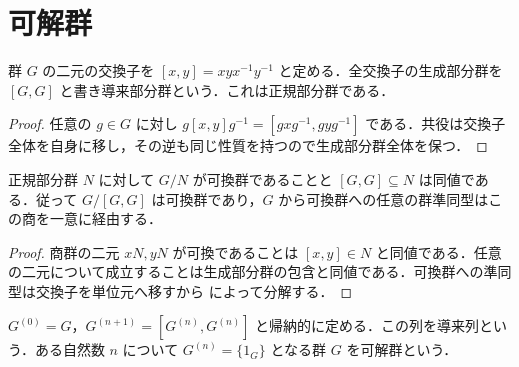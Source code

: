\section{可解群}
\begin{defn}[交換子と導来部分群]
群 $G$ の二元の交換子を $[x,y]=xyx^{-1}y^{-1}$ と定める．全交換子の生成部分群を $[G,G]$ と書き導来部分群という．これは正規部分群である．
\end{defn}
\begin{proof}
任意の $g\in G$ に対し $g[x,y]g^{-1}=[gxg^{-1},gyg^{-1}]$ である．共役は交換子全体を自身に移し，その逆も同じ性質を持つので生成部分群全体を保つ．
\end{proof}
\begin{prop}[可換化]
正規部分群 $N$ に対して $G/N$ が可換群であることと $[G,G]\subseteq N$ は同値である．従って $G/[G,G]$ は可換群であり，$G$ から可換群への任意の群準同型はこの商を一意に経由する．
\end{prop}
\begin{proof}
商群の二元 $xN,yN$ が可換であることは $[x,y]\in N$ と同値である．任意の二元について成立することは生成部分群の包含と同値である．可換群への準同型は交換子を単位元へ移すから  によって分解する．
\end{proof}
\begin{defn}[可解群]
$G^{(0)}=G$，$G^{(n+1)}=[G^{(n)},G^{(n)}]$ と帰納的に定める．この列を導来列という．ある自然数 $n$ について $G^{(n)}=\{1_G\}$ となる群 $G$ を可解群という．
\end{defn}
